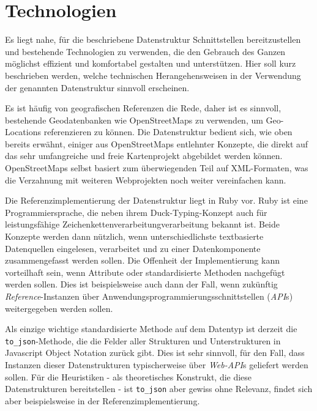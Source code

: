 \section{Technologien}
\label{technologies}
Es liegt nahe, für die beschriebene Datenstruktur Schnittstellen bereitzustellen und bestehende Technologien zu verwenden, die den Gebrauch des Ganzen möglichst effizient und komfortabel gestalten und unterstützen. Hier soll kurz beschrieben werden, welche technischen Herangehensweisen in der Verwendung der genannten Datenstruktur sinnvoll erscheinen.

Es ist häufig von geografischen Referenzen die Rede, daher ist es sinnvoll, bestehende Geodatenbanken wie OpenStreetMaps zu verwenden, um Geo-Locations referenzieren zu können. Die Datenstruktur bedient sich, wie oben bereits erwähnt, einiger aus OpenStreetMaps entlehnter Konzepte, die direkt auf das sehr umfangreiche und freie Kartenprojekt abgebildet werden können. OpenStreetMaps selbst basiert zum überwiegenden Teil auf XML-Formaten, was die Verzahnung mit weiteren Webprojekten noch weiter vereinfachen kann.

Die Referenzimplementierung der Datenstruktur liegt in Ruby vor. Ruby ist eine Programmiersprache, die neben ihrem Duck-Typing-Konzept auch für leistungsfähige Zeichenkettenverarbeitungverarbeitung bekannt ist. Beide Konzepte werden dann nützlich, wenn unterschiedlichste textbasierte Datenquellen eingelesen, verarbeitet und zu einer Datenkomponente zusammengefasst werden sollen. Die Offenheit der Implementierung kann vorteilhaft sein, wenn Attribute oder standardisierte Methoden nachgefügt werden sollen. Dies ist beispielsweise auch dann der Fall, wenn zukünftig \textit{Reference}-Instanzen über Anwendungsprogrammierungsschnittstellen (\textit{API}s) weitergegeben werden sollen.

Als einzige wichtige standardisierte Methode auf dem Datentyp ist derzeit die \texttt{to\_json}-Methode, die die Felder aller Strukturen und Unterstrukturen in Javascript Object Notation\cite{jsonspec} zurück gibt. Dies ist sehr sinnvoll, für den Fall, dass Instanzen dieser Datenstrukturen typischerweise über \textit{Web-API}s geliefert werden sollen. Für die Heuristiken - als theoretisches Konstrukt, die diese Datenstrukturen bereitstellen - ist \texttt{to\_json} aber gewiss ohne Relevanz, findet sich aber beispielsweise in der Referenzimplementierung.
